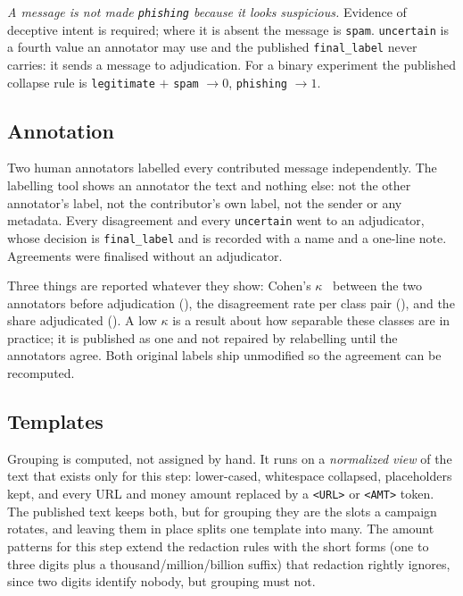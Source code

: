 \emph{A message is not made \texttt{phishing} because it looks suspicious.} Evidence of
deceptive intent is required; where it is absent the message is \texttt{spam}.
\texttt{uncertain} is a fourth value an annotator may use and the published
\texttt{final\_label} never carries: it sends a message to adjudication. For a binary experiment
the published collapse rule is \texttt{legitimate} $+$ \texttt{spam} $\to 0$, \texttt{phishing}
$\to 1$.

\subsection*{Annotation}
Two human annotators labelled every contributed message independently. The labelling tool shows
an annotator the text and nothing else: not the other annotator's label, not the contributor's
own label, not the sender or any metadata. Every disagreement and every \texttt{uncertain} went
to an adjudicator, whose decision is \texttt{final\_label} and is recorded with a name and a
one-line note. Agreements were finalised without an adjudicator.

Three things are reported whatever they show: Cohen's $\kappa$~\cite{cohen_sms} between the two
annotators before adjudication (\FILL{}), the disagreement rate per class pair (\FILL{}), and
the share adjudicated (\FILL{}). A low $\kappa$ is a result about how separable these classes
are in practice; it is published as one and not repaired by relabelling until the annotators
agree. Both original labels ship unmodified so the agreement can be recomputed.

\subsection*{Templates}
Grouping is computed, not assigned by hand. It runs on a \emph{normalized view} of the text
that exists only for this step: lower-cased, whitespace collapsed, placeholders kept, and every
URL and money amount replaced by a \texttt{<URL>} or \texttt{<AMT>} token. The published text
keeps both, but for grouping they are the slots a campaign rotates, and leaving them in place
splits one template into many. The amount patterns for this step extend the redaction rules
with the short forms (one to three digits plus a thousand/million/billion suffix) that redaction
rightly ignores, since two digits identify nobody, but grouping must not.

